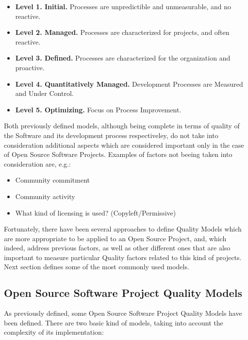\documentclass[11pt]{article}
\begin{document}
\begin{itemize}\itemsep0pt
\item{\textbf{Level 1. Initial.}} Processes are unpredictible and unmeasurable, and no reactive.
\item{\textbf{Level 2. Managed.}} Processes are characterized for projects, and often reactive.
\item{\textbf{Level 3. Defined.}} Processes are characterized for the organization and proactive. 
\item{\textbf{Level 4. Quantitatively Managed.}} Development Processes are Measured and Under Control.
\item{\textbf{Level 5. Optimizing.}} Focus on Process Improvement.
\end{itemize}
Both previously defined models, although being complete in terms of quality of the Software and its development process respectiveley, do not take into consideration additional aspects which are considered important only in the case of Open Source Software Projects. Examples of factors not beeing taken into consideration are, e.g.:
\begin{itemize}\itemsep0pt
\item{Community commitment}
\item{Community activity}
\item{What kind of licensing is used? (Copyleft/Permissive)}
\end{itemize}
Fortunately, there have been several approaches to define Quality Models which are more appropriate to be applied to an Open Source Project, and, which indeed, address previous factors, as well as other different ones that are also important to measure particular Quality factors related to this kind of projects. Next section defines some of the most commonly used models.

\subsection{Open Source Software Project Quality Models}\label{sec:oss_quality_models}

As previously defined, some Open Source Software Project Quality Models have been defined. There are two basic kind of models, taking into account the complexity of its implementation:
\end{document}
